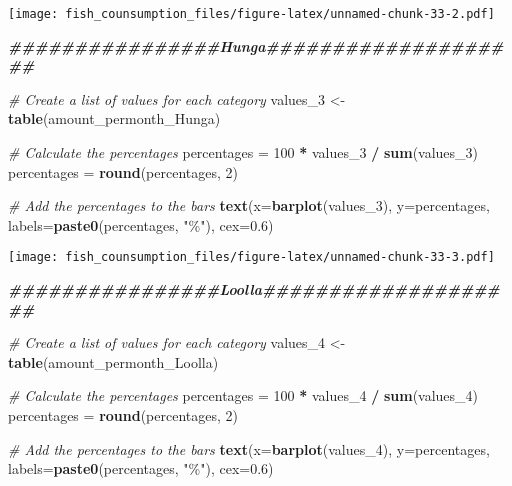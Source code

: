 \documentclass[
]{article}
\newenvironment{Shaded}{\begin{snugshade}}{\end{snugshade}}
\newcommand{\AttributeTok}[1]{\textcolor[rgb]{0.13,0.29,0.53}{#1}}
\newcommand{\CommentTok}[1]{\textcolor[rgb]{0.56,0.35,0.01}{\textit{#1}}}
\newcommand{\DecValTok}[1]{\textcolor[rgb]{0.00,0.00,0.81}{#1}}
\newcommand{\DocumentationTok}[1]{\textcolor[rgb]{0.56,0.35,0.01}{\textbf{\textit{#1}}}}
\newcommand{\FloatTok}[1]{\textcolor[rgb]{0.00,0.00,0.81}{#1}}
\newcommand{\FunctionTok}[1]{\textcolor[rgb]{0.13,0.29,0.53}{\textbf{#1}}}
\newcommand{\NormalTok}[1]{#1}
\newcommand{\OtherTok}[1]{\textcolor[rgb]{0.56,0.35,0.01}{#1}}
\newcommand{\SpecialCharTok}[1]{\textcolor[rgb]{0.81,0.36,0.00}{\textbf{#1}}}
\newcommand{\StringTok}[1]{\textcolor[rgb]{0.31,0.60,0.02}{#1}}
\begin{document}
\texttt{[image: fish\_counsumption\_files/figure-latex/unnamed-chunk-33-2.pdf]}

\begin{Shaded}
\begin{Highlighting}[]
\DocumentationTok{\#\#\#\#\#\#\#\#\#\#\#\#\#\#\#\#Hunga\#\#\#\#\#\#\#\#\#\#\#\#\#\#\#\#\#\#\#\#}

\CommentTok{\# Create a list of values for each category}
\NormalTok{values\_3 }\OtherTok{\textless{}{-}} \FunctionTok{table}\NormalTok{(amount\_permonth\_Hunga)}

\CommentTok{\# Calculate the percentages}
\NormalTok{percentages }\OtherTok{=} \DecValTok{100} \SpecialCharTok{*}\NormalTok{ values\_3 }\SpecialCharTok{/} \FunctionTok{sum}\NormalTok{(values\_3)}
\NormalTok{percentages }\OtherTok{=} \FunctionTok{round}\NormalTok{(percentages, }\DecValTok{2}\NormalTok{)}

\CommentTok{\# Add the percentages to the bars}
\FunctionTok{text}\NormalTok{(}\AttributeTok{x=}\FunctionTok{barplot}\NormalTok{(values\_3), }\AttributeTok{y=}\NormalTok{percentages, }\AttributeTok{labels=}\FunctionTok{paste0}\NormalTok{(percentages, }\StringTok{"\%"}\NormalTok{), }\AttributeTok{cex=}\FloatTok{0.6}\NormalTok{)}
\end{Highlighting}
\end{Shaded}

\texttt{[image: fish\_counsumption\_files/figure-latex/unnamed-chunk-33-3.pdf]}

\begin{Shaded}
\begin{Highlighting}[]
\DocumentationTok{\#\#\#\#\#\#\#\#\#\#\#\#\#\#\#\#Loolla\#\#\#\#\#\#\#\#\#\#\#\#\#\#\#\#\#\#\#\#}

\CommentTok{\# Create a list of values for each category}
\NormalTok{values\_4 }\OtherTok{\textless{}{-}} \FunctionTok{table}\NormalTok{(amount\_permonth\_Loolla)}

\CommentTok{\# Calculate the percentages}
\NormalTok{percentages }\OtherTok{=} \DecValTok{100} \SpecialCharTok{*}\NormalTok{ values\_4 }\SpecialCharTok{/} \FunctionTok{sum}\NormalTok{(values\_4)}
\NormalTok{percentages }\OtherTok{=} \FunctionTok{round}\NormalTok{(percentages, }\DecValTok{2}\NormalTok{)}

\CommentTok{\# Add the percentages to the bars}
\FunctionTok{text}\NormalTok{(}\AttributeTok{x=}\FunctionTok{barplot}\NormalTok{(values\_4), }\AttributeTok{y=}\NormalTok{percentages, }\AttributeTok{labels=}\FunctionTok{paste0}\NormalTok{(percentages, }\StringTok{"\%"}\NormalTok{), }\AttributeTok{cex=}\FloatTok{0.6}\NormalTok{)}
\end{Highlighting}
\end{Shaded}
\end{document}
